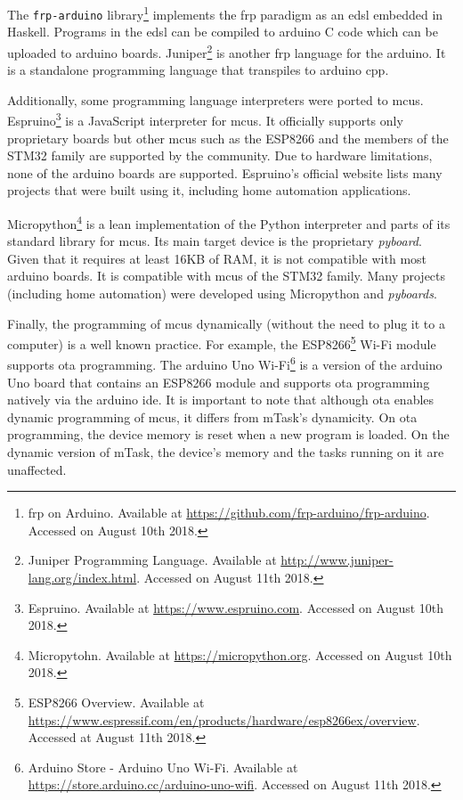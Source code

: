 The \texttt{frp-arduino} library\footnote{\acs{frp} on Arduino. Available at \url{https://github.com/frp-arduino/frp-arduino}. Accessed on August 10th 2018.} implements the \ac{frp} paradigm as an \ac{edsl} embedded in Haskell. Programs in the \ac{edsl} can be compiled to \gls{arduino} C code which can be uploaded to \gls{arduino} boards. Juniper\footnote{Juniper Programming Language. Available at \url{http://www.juniper-lang.org/index.html}. Accessed on August 11th 2018.} is another \ac{frp} language for the \gls{arduino}. It is a standalone programming language that transpiles to \gls{arduino} \gls{cpp}.

Additionally, some programming language interpreters were ported to \glspl{mcu}. Espruino\footnote{Espruino. Available at \url{https://www.espruino.com}. Accessed on August 10th 2018.} is a JavaScript interpreter for \glspl{mcu}. It officially supports only proprietary boards but other \glspl{mcu} such as the ESP8266 and the members of the STM32 family are supported by the community. Due to hardware limitations, none of the \gls{arduino} boards are supported. Espruino's official website lists many projects that were built using it, including home automation applications. 

Micropython\footnote{Micropytohn. Available at \url{https://micropython.org}. Accessed on August 10th 2018.} is a lean implementation of the Python interpreter and parts of its standard library for \glspl{mcu}. Its main target device is the proprietary \textit{pyboard}. Given that it requires at least 16KB of RAM, it is not compatible with most \gls{arduino} boards. It is compatible with \glspl{mcu} of the STM32 family. Many projects (including home automation) were developed using Micropython and \textit{pyboards}. 

Finally, the programming of \glspl{mcu} dynamically (without the need to plug it to a computer) is a well known practice. For example, the ESP8266\footnote{ESP8266 Overview. Available at \url{https://www.espressif.com/en/products/hardware/esp8266ex/overview}. Accessed at August 11th 2018.} Wi-Fi module supports \ac{ota} programming. The \gls{arduino} Uno Wi-Fi\footnote{Arduino Store - Arduino Uno Wi-Fi. Available at \url{https://store.arduino.cc/arduino-uno-wifi}. Accessed on August 11th 2018.} is a version of the \gls{arduino} Uno board that contains an ESP8266 module and supports \ac{ota} programming natively via the \gls{arduino} \acs{ide}. It is important to note that although \ac{ota} enables dynamic programming of \glspl{mcu}, it differs from \gls{mTask}'s dynamicity. On \ac{ota} programming, the device memory is reset when a new program is loaded. On the dynamic version of \gls{mTask}, the device's memory and the tasks running on it are unaffected.